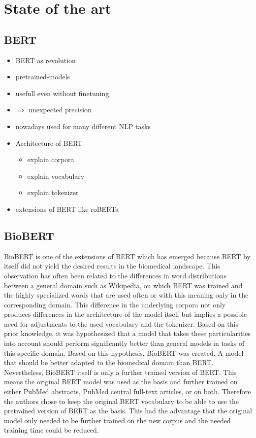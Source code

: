 \chapter{State of the art}
\section{BERT}
\color{ForestGreen}
\begin{itemize}
	\item BERT as revolution
	\item pretrained-models
	\item usefull even without finetuning
	\item $\Rightarrow$ unexpected precision
	\item nowadays used for many different NLP tasks
	\item Architecture of BERT
	\begin{itemize}
		\item explain corpora
		\item explain vocabulary
		\item explain tokenizer
	\end{itemize}
	\item extensions of BERT like roBERTa
\end{itemize}
\color{black}
\section{BioBERT}
BioBERT is one of the extensions of BERT which has emerged because BERT by itself did not yield the desired results in the biomedical landscape. This observation has often been related to the differences in word distributions between a general domain such as Wikipedia, on which BERT was trained and the highly specialized words that are used often or with this meaning only in the corresponding domain. This difference in the underlying corpora not only produces differences in the architecture of the model itself but implies a possible need for adjustments to the used vocabulary and the tokenizer. \cite{Lee2019} 
\newline
Based on this prior knowledge, it was hypothesized that a model that takes these particularities into account should perform significantly better than general models in tasks of this specific domain. Based on this hypothesis, BioBERT was created. A model that should be better adapted to the biomedical domain than BERT.
\newline
Nevertheless, BioBERT itself is only a further trained version of BERT. This means the original BERT model was used as the basis and further trained on either PubMed abstracts, PubMed central full-text articles, or on both. Therefore the authors chose to keep the original BERT vocabulary to be able to use the pretrained version of BERT as the basis. This had the advantage that the original model only needed to be further trained on the new corpus and the needed training time could be reduced.


